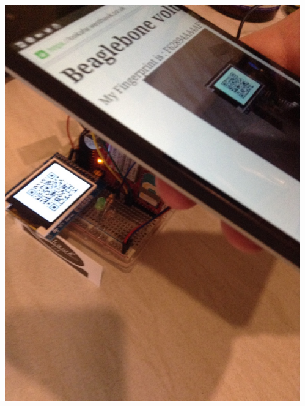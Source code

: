 \documentclass[handout, notes=hide]{beamer}
\begin{document}
\begin{frame}
\begin{columns}[T]
\begin{column}[T]{0.33333\textwidth}
\includegraphics[width=1.0\textwidth]{iot-scan}
\end{column}
\begin{column}[T]{0.33333\textwidth}

\end{column}
\end{columns}
\end{frame}
\end{document}
